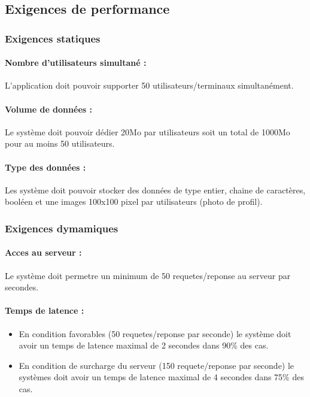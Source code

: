 \documentclass{article}
\begin{document}
\begin{itemize}
\begin{itemize}
\begin{itemize}
\begin{itemize}
\end{itemize}

\subsection{Exigences de performance}
\subsubsection{Exigences statiques}
\paragraph{Nombre d'utilisateurs simultané :}
L'application doit pouvoir supporter 50 utilisateurs/terminaux
simultanément.
\paragraph{Volume de données :}
Le système doit pouvoir dédier 20Mo par utilisateurs soit un total de
1000Mo pour au moins 50 utilisateurs.
\paragraph{Type des données :}
Les système doit pouvoir stocker des données de type entier, chaine de
caractères, booléen et une images 100x100 pixel par utilisateurs
(photo de profil).


\subsubsection{Exigences dymamiques}
\paragraph{Acces au serveur :}
Le système doit permetre un minimum de 50 requetes/reponse au serveur
par secondes.
\paragraph{Temps de latence :}
\begin{itemize}
\item En condition favorables (50 requetes/reponse par seconde) le
  système doit avoir un temps de latence maximal de 2 secondes dans
  90\% des cas.
\item En condition de surcharge du serveur (150 requete/reponse par
  seconde) le systèmes doit avoir un temps de latence maximal de 4
  secondes dans 75\% des cas.
\end{itemize}


\end{itemize}
\end{itemize}
\end{itemize}
\end{document}
